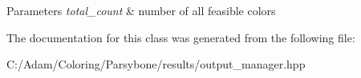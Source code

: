 \begin{DoxyParams}{Parameters}
{\em total\-\_\-count} & number of all feasible colors \\
\hline
\end{DoxyParams}


The documentation for this class was generated from the following file\-:\begin{DoxyCompactItemize}
\item 
C\-:/\-Adam/\-Coloring/\-Parsybone/results/output\-\_\-manager.\-hpp\end{DoxyCompactItemize}
